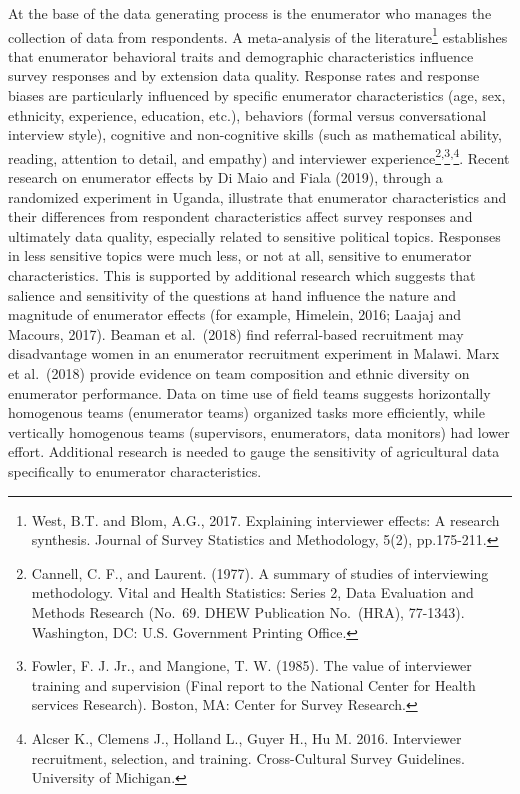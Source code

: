 \documentclass[
]{book}
\begin{document}
At the base of the data generating process is the enumerator who manages the collection of data from respondents. A meta-analysis of the literature\footnote{West, B.T. and Blom, A.G., 2017. Explaining interviewer effects: A research synthesis. Journal of Survey Statistics and Methodology, 5(2), pp.175-211.} establishes that enumerator behavioral traits and demographic characteristics influence survey responses and by extension data quality. Response rates and response biases are particularly influenced by specific enumerator characteristics (age, sex, ethnicity, experience, education, etc.), behaviors (formal versus conversational interview style), cognitive and non-cognitive skills (such as mathematical ability, reading, attention to detail, and empathy) and interviewer experience\footnote{Cannell, C. F., and Laurent. (1977). A summary of studies of interviewing methodology. Vital and Health Statistics: Series 2, Data Evaluation and Methods Research (No.~69. DHEW Publication No.~(HRA), 77-1343). Washington, DC: U.S. Government Printing Office.}\textsuperscript{,}\footnote{Fowler, F. J. Jr., and Mangione, T. W. (1985). The value of interviewer training and supervision (Final report to the National Center for Health services Research). Boston, MA: Center for Survey Research.}\textsuperscript{,}\footnote{Alcser K., Clemens J., Holland L., Guyer H., Hu M. 2016. Interviewer recruitment, selection, and training. Cross-Cultural Survey Guidelines. University of Michigan.}. Recent research on enumerator effects by Di Maio and Fiala (2019), through a randomized experiment in Uganda, illustrate that enumerator characteristics and their differences from respondent characteristics affect survey responses and ultimately data quality, especially related to sensitive political topics. Responses in less sensitive topics were much less, or not at all, sensitive to enumerator characteristics. This is supported by additional research which suggests that salience and sensitivity of the questions at hand influence the nature and magnitude of enumerator effects (for example, Himelein, 2016; Laajaj and Macours, 2017). Beaman et al.~(2018) find referral-based recruitment may disadvantage women in an enumerator recruitment experiment in Malawi. Marx et al.~(2018) provide evidence on team composition and ethnic diversity on enumerator performance. Data on time use of field teams suggests horizontally homogenous teams (enumerator teams) organized tasks more efficiently, while vertically homogenous teams (supervisors, enumerators, data monitors) had lower effort. Additional research is needed to gauge the sensitivity of agricultural data specifically to enumerator characteristics.
\end{document}
